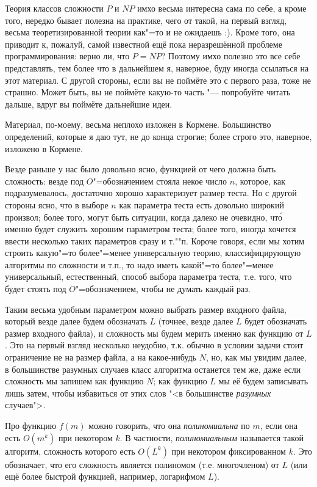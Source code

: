 {

Теория классов сложности $P$ и $NP$ имхо весьма интересна сама по себе, а кроме 
того, нередко бывает полезна на практике, чего от такой, на первый взгляд, 
весьма теоретизированной теории как"=то и не ожидаешь :). Кроме того, она 
приводит к, пожалуй, самой известной ещё пока неразрешённой проблеме 
программирования: верно ли, что $P=NP$? Поэтому имхо полезно это все 
себе представлять, тем более что в дальнейшем я, наверное, буду иногда ссылаться на 
этот материал. С другой стороны, если вы не поймёте это с первого раза, тоже не 
страшно. Может быть, вы не поймёте какую-то часть "--- попробуйте читать 
дальше, вдруг вы поймёте дальнейшие идеи.

Материал, по-моему, весьма неплохо изложен в Кормене. Большинство определений, 
которые я даю тут, не до конца строгие; более строго это, наверное, изложено в 
Кормене.

 Везде раньше у нас было довольно ясно, 
функцией от чего должна быть сложность: везде под $O$"=обозначением стояла 
некое число $n$, которое, как подразумевалось, достаточно хорошо характеризует 
размер теста. Но с другой стороны ясно, что в выборе $n$ как параметра теста 
есть довольно широкий произвол; более того, могут быть ситуации, когда далеко 
не очевидно, чт\'{о} именно будет служить хорошим параметром теста; более того, 
иногда хочется ввести несколько таких параметров сразу и т.""п. Короче говоря, 
если мы хотим строить какую"=то более"=менее универсальную теорию, 
классифицирующую алгоритмы по сложности и т.п., то надо иметь какой"=то 
более"=менее универсальный, естественный, способ выбора параметра теста, т.е. 
того, что будет стоять под $O$"=обозначением, чтобы не думать каждый раз.

Таким весьма удобным параметром можно выбрать размер входного файла, который 
везде далее будем обозначать $L$ (точнее, везде далее $L$ будет обозначать 
размер входного файла), и сложность мы будем мерить именно как функцию от $L$. 
Это на первый взгляд несколько неудобно, т.к. обычно в условии задачи стоит 
ограничение не на размер файла, а на какое-нибудь $N$, но, как мы увидим далее, 
в большинстве разумных случаев класс алгоритма останется тем же, даже если 
сложность мы запишем как функцию $N$; как функцию $L$ мы её будем записывать 
лишь затем, чтобы избавиться от этих слов "<в большинстве \textit{разумных} 
случаев">.

 Про функцию 
$f(m)$ можно говорить, что она \textit{полиномиальна} по $m$, если она есть 
$O(m^k)$ при некотором $k$. В частности,
\textit{полиномиальным} называется такой алгоритм, сложность которого есть 
$O(L^k)$ при некотором фиксированном $k$. Это обозначает, что его сложность 
является полиномом (т.е. многочленом) от $L$ (или ещё более быстрой функцией, 
например, логарифмом $L$).

}
